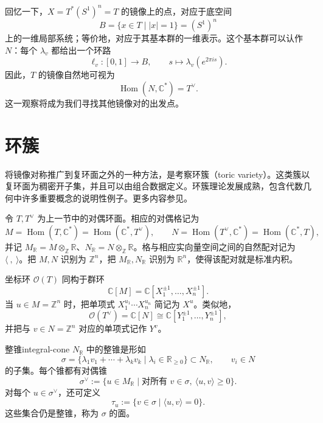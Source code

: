 回忆一下，$X=T^*(S^1)^n=T$ 的镜像上的点，对应于底空间
\[
  B=\{x\in T\mid|x|=1\}=(S^1)^n
\]
上的一维局部系统；等价地，对应于其基本群的一维表示。这个基本群可以认作 $N$：每个 $\lambda_v$ 都给出一个环路
\[
  \ell_v\colon[0,1]\to B,\qquad
  s\longmapsto\lambda_v(e^{2\pi is}).
\]
因此，$T$ 的镜像自然地可视为
\[
  \operatorname{Hom}(N,\mathbb C^*)=T^\vee.
\]
这一观察将成为我们寻找其他镜像对的出发点。

\section{环簇}\label{sec:toric-varieties}
将镜像对称推广到复环面之外的一种方法，是考察环簇（toric variety）。这类簇以复环面为稠密开子集，并且可以由组合数据定义。环簇理论发展成熟，包含代数几何中许多重要概念的说明性例子。更多内容参见。

令 $T,T^\vee$ 为上一节中的对偶环面。相应的对偶格记为
\[
  M=\operatorname{Hom}(T,\mathbb C^*)=\operatorname{Hom}(\mathbb C^*,T^\vee),
  \qquad
  N=\operatorname{Hom}(T^\vee,\mathbb C^*)=\operatorname{Hom}(\mathbb C^*,T),
\]
并记 $M_{\mathbb R}=M\otimes_{\mathbb Z}\mathbb R$、$N_{\mathbb R}=N\otimes_{\mathbb Z}\mathbb R$。格与相应实向量空间之间的自然配对记为 $\langle\ ,\ \rangle$。把 $M,N$ 识别为 $\mathbb Z^n$，把 $M_{\mathbb R},N_{\mathbb R}$ 识别为 $\mathbb R^n$，使得该配对就是标准内积。

坐标环 $\mathcal O(T)$ 同构于群环
\[
  \mathbb C[M]=\mathbb C[X_1^{\pm1},\ldots,X_n^{\pm1}].
\]
当 $u\in M=\mathbb Z^n$ 时，把单项式 $X_1^{u_1}\cdots X_n^{u_n}$ 简记为 $X^u$。类似地，
\[
  \mathcal O(T^\vee)=\mathbb C[N]\cong\mathbb C[Y_1^{\pm1},\ldots,Y_n^{\pm1}],
\]
并把与 $v\in N=\mathbb Z^n$ 对应的单项式记作 $Y^v$。

\begin{definition}{整锥}{integral-cone}
$N_{\mathbb R}$ 中的整锥是形如
\[
  \sigma=\{\lambda_1v_1+\cdots+\lambda_kv_k\mid
  \lambda_i\in\mathbb R_{\geq0}\}\subset N_{\mathbb R},
  \qquad v_i\in N
\]
的子集。每个锥都有对偶锥
\[
  \sigma^\vee:=\{u\in M_{\mathbb R}\mid
  \text{对所有 }v\in\sigma,\ \langle u,v\rangle\geq0\}.
\]
对每个 $u\in\sigma^\vee$，还可定义
\[
  \tau_u:=\{v\in\sigma\mid\langle u,v\rangle=0\}.
\]
这些集合仍是整锥，称为 $\sigma$ 的面。
\end{definition}

